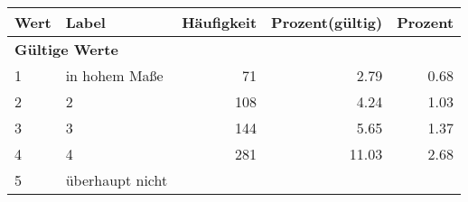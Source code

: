      \begin{longtable}{lXrrr}
     \toprule
     \textbf{Wert} & \textbf{Label} & \textbf{Häufigkeit} & \textbf{Prozent(gültig)} & \textbf{Prozent} \\
     \endhead
     \midrule
     \multicolumn{5}{l}{\textbf{Gültige Werte}}\\

     1 &
     \multicolumn{1}{X}{ in hohem Maße   } &


       \num{71} &
       \num[round-mode=places,round-precision=2]{2.79} &
         \num[round-mode=places,round-precision=2]{0.68} \\

     2 &
     \multicolumn{1}{X}{ 2   } &


       \num{108} &
       \num[round-mode=places,round-precision=2]{4.24} &
         \num[round-mode=places,round-precision=2]{1.03} \\

     3 &
     \multicolumn{1}{X}{ 3   } &


       \num{144} &
       \num[round-mode=places,round-precision=2]{5.65} &
         \num[round-mode=places,round-precision=2]{1.37} \\

     4 &
     \multicolumn{1}{X}{ 4   } &


       \num{281} &
       \num[round-mode=places,round-precision=2]{11.03} &
         \num[round-mode=places,round-precision=2]{2.68} \\

     5 &
     \multicolumn{1}{X}{ überhaupt nicht   } &



\end{longtable}
